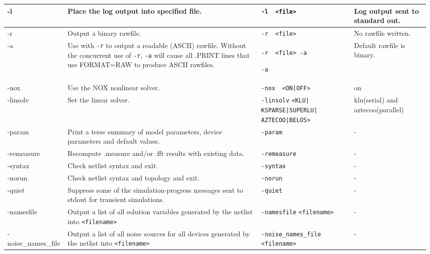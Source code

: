 \begin{longtable}[h] {>{\raggedright\small}m{1.1in}|>{\raggedright\small}m{2in}|>{\raggedright\small}m{1.5in}|>{\raggedright\let\\\tabularnewline\small}m{1in}}
-l &
Place the log output into specified file. &
\verb+-l  <file>+ &
Log output sent to standard out. \\ \hline

-r &
Output a binary rawfile. &
\verb+-r  <file>+ &
No rawfile written. \\ \hline

-a &
Use with \verb+-r+ to output a readable (ASCII) rawfile.
Without the concurrent use of \verb+-r+, \verb+-a+
will cause all .PRINT lines that use FORMAT=RAW to produce
ASCII rawfiles. &
\verb+-r  <file> -a+

\verb+-a+ &
Default rawfile is binary. \\ \hline

-nox &
Use the NOX nonlinear solver. &
\verb+-nox  <ON|OFF>+ &
on \\ \hline

-linsolv &
Set the linear solver. &
\verb+-linsolv+
\verb+<KLU|+
\verb+KSPARSE|SUPERLU|+
\verb+AZTECOO|BELOS>+ &
klu(serial) and aztecoo(parallel) \\ \hline

-param &
Print a terse summary of model parameters, device parameters and default values. &
\verb+-param+ &
- \\ \hline

-remeasure &
Recompute .measure and/or .fft results with existing data. &
\verb+-remeasure+ &
- \\ \hline

-syntax &
Check netlist syntax and exit.&
\verb+-syntax+ &
- \\ \hline

-norun &
Check netlist syntax and topology and exit. &
\verb+-norun+ &
- \\ \hline

-quiet &
Suppress some of the simulation-progress messages
sent to stdout for transient simulations. &
\verb+-quiet+ &
- \\ \hline

-namesfile &
Output a list of all solution variables generated by the netlist
into \tt{<filename>} &
\verb+-namesfile+
\verb+<filename>+ &
- \\ \hline

-noise\_names\_file &
Output a list of all noise sources for all devices generated by the netlist
into \tt{<filename>} &
\verb+-noise_names_file+
\verb+<filename>+ &
- \\ \hline


\end{longtable}
